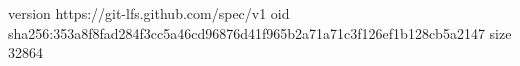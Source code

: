 version https://git-lfs.github.com/spec/v1
oid sha256:353a8f8fad284f3cc5a46cd96876d41f965b2a71a71c3f126ef1b128cb5a2147
size 32864
